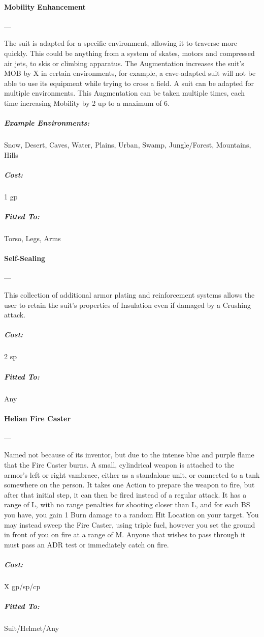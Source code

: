 \documentclass[oneside,11pt,english]{book}
\begin{document}
\paragraph{Mobility Enhancement}---\quad[1]

The suit is adapted for a specific environment, allowing it to traverse more
quickly. This could be anything from a system of skates, motors and compressed
air jets, to skis or climbing apparatus. The Augmentation increases the suit’s
MOB by X in certain environments, for example, a cave-adapted suit will not be
able to use its equipment while trying to cross a field. A suit can be adapted
for multiple environments. This Augmentation can be taken multiple times, each
time increasing Mobility by 2 up to a maximum of 6.
\vspace{-20pt}\subparagraph{Example Environments:} Snow, Desert, Caves, Water,
Plains, Urban, Swamp, Jungle/Forest, Mountains, Hills 

\vspace{-15pt}\subparagraph{Cost:} 1 gp
\vspace{-15pt}\subparagraph{Fitted To:} Torso, Legs, Arms

\paragraph{Self-Sealing}---\quad[1]

This collection of additional armor plating and reinforcement systems allows the user to retain the suit’s 
properties of Insulation even if damaged by a Crushing attack. 
\vspace{-15pt}\subparagraph{Cost:} 2 sp
\vspace{-15pt}\subparagraph{Fitted To:} Any

\paragraph{Helian Fire Caster}---\quad[X]

Named not because of its inventor, but due to the intense blue and purple flame
that the Fire Caster burns. A small, cylindrical weapon is attached to the
armor’s left or right vambrace, either as a standalone unit, or connected to a
tank somewhere on the person. It takes one Action to prepare the weapon to fire,
but after that initial step, it can then be fired instead of a regular attack.
It has a range of L, with no range penalties for shooting closer than L, and for
each BS you have, you gain 1 Burn damage to a random Hit Location on your
target. You may instead sweep the Fire Caster, using triple fuel, however you
set the ground in front of you on fire at a range of M. Anyone that wishes to
pass through it must pass an ADR test or immediately catch on fire.  
\vspace{-15pt}\subparagraph{Cost:} X gp/sp/cp
\vspace{-15pt}\subparagraph{Fitted To:} Suit/Helmet/Any
\end{document}
